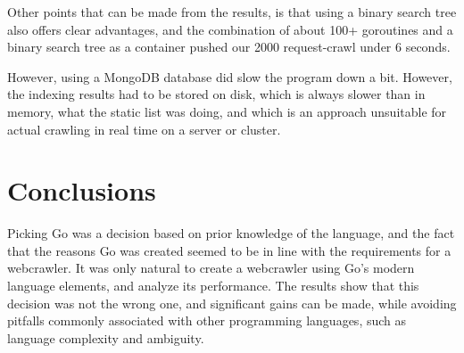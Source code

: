\documentclass[]{article}
\begin{document}
Other points that can be made from the results, is that using a binary
search tree also offers clear advantages, and the combination of about
100+ goroutines and a binary search tree as a container pushed our 2000
request-crawl under 6 seconds.

However, using a MongoDB database did slow the program down a bit.
However, the indexing results had to be stored on disk, which is always
slower than in memory, what the static list was doing, and which is an
approach unsuitable for actual crawling in real time on a server or
cluster.

\section{Conclusions}\label{conclusions}

Picking Go was a decision based on prior knowledge of the language, and
the fact that the reasons Go was created seemed to be in line with the
requirements for a webcrawler. It was only natural to create a
webcrawler using Go's modern language elements, and analyze its
performance. The results show that this decision was not the wrong one,
and significant gains can be made, while avoiding pitfalls commonly
associated with other programming languages, such as language complexity
and ambiguity.
\end{document}
